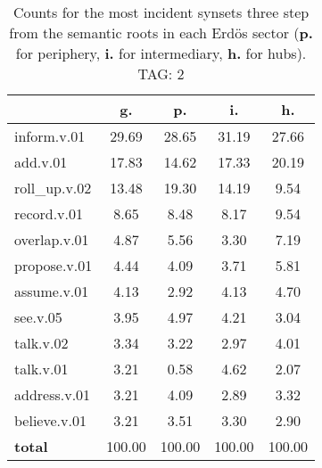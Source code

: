 \begin{table}[h!]
\begin{center}
\begin{tabular}{| l | c | c | c | c |}\hline
 & g. & p. & i. & h. \\\hline
inform.v.01 & 29.69  & 28.65  & 31.19  & 27.66 \\\hline
add.v.01 & 17.83  & 14.62  & 17.33  & 20.19 \\\hline
roll\_up.v.02 & 13.48  & 19.30  & 14.19  & 9.54 \\\hline
record.v.01 & 8.65  & 8.48  & 8.17  & 9.54 \\\hline
overlap.v.01 & 4.87  & 5.56  & 3.30  & 7.19 \\\hline
propose.v.01 & 4.44  & 4.09  & 3.71  & 5.81 \\\hline
assume.v.01 & 4.13  & 2.92  & 4.13  & 4.70 \\\hline
see.v.05 & 3.95  & 4.97  & 4.21  & 3.04 \\\hline
talk.v.02 & 3.34  & 3.22  & 2.97  & 4.01 \\\hline
talk.v.01 & 3.21  & 0.58  & 4.62  & 2.07 \\\hline
address.v.01 & 3.21  & 4.09  & 2.89  & 3.32 \\\hline
believe.v.01 & 3.21  & 3.51  & 3.30  & 2.90 \\\hline
{{\bf total}} & 100.00  & 100.00  & 100.00  & 100.00 \\\hline
\end{tabular}
\caption{Counts for the most incident synsets three step from the semantic roots in each Erd\"os sector ({\bf p.} for periphery, {\bf i.} for intermediary, {\bf h.} for hubs). TAG: 2}
\end{center}
\end{table}